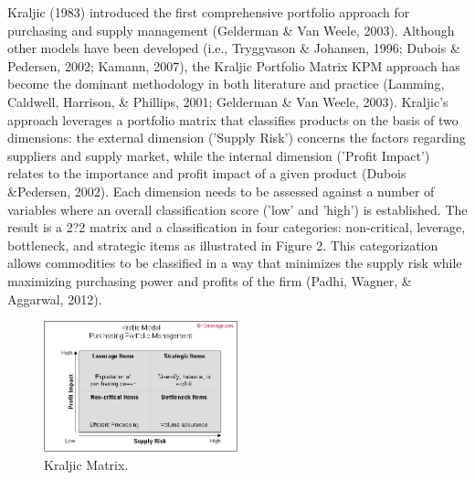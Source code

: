 \documentclass[twocolumn]{svjour3}       %
\begin{document}
Kraljic (1983) introduced the first comprehensive portfolio approach for purchasing and supply management (Gelderman \& Van Weele, 2003).  Although other models have been developed (i.e., Tryggvason \& Johansen, 1996; Dubois \& Pedersen, 2002; Kamann, 2007), the Kraljic Portfolio Matrix KPM approach has become the dominant methodology in both literature and practice (Lamming, Caldwell, Harrison, \& Phillips, 2001; Gelderman \& Van Weele, 2003). Kraljic's approach leverages a portfolio matrix that classifies products on the basis of two dimensions: the external dimension ('Supply Risk') concerns the factors regarding suppliers and supply market, while the internal dimension ('Profit Impact') relates to the importance and profit impact of a given product (Dubois \&Pedersen, 2002). Each dimension needs to be assessed against a number of variables where an overall classification score ('low' and 'high') is established. The result is a 2?2 matrix and a classification in four categories: non-critical, leverage, bottleneck, and strategic items as illustrated in Figure 2. This categorization allows commodities to be classified in a way that minimizes the supply risk while maximizing purchasing power and profits of the firm (Padhi, Wagner, \& Aggarwal, 2012).

\begin{figure}[!htb]
  \includegraphics[width=0.5\textwidth]{kraljic-matrix.png}
  \caption{Kraljic Matrix.}
  \label{fig:2}
\end{figure}
\end{document}
